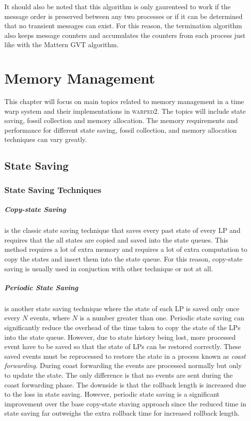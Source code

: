 \documentclass[11pt]{book}
\begin{document}
It should also be noted that this algorithm is only gaurenteed to work if the message order
is preserved between any two processes or if it can be determined that no transient messages
can exist. For this reason, the termination algorithm also keeps message counters and accumulates
the counters from each process just like with the Mattern GVT algorithm.



\chapter{Memory Management}\label{memory_management}

This chapter will focus on main topics related to memory management in a time warp system
and their implementations in \textsc{warped2}. The topics will include state saving, fossil
collection and memory allocation. The memory requirements and performance for different state
saving, fossil collection, and memory allocation techniques can vary greatly.

\section{State Saving}

\subsection{State Saving Techniques}

\paragraph{Copy-state Saving} is the classic state saving technique that saves every past
state of every LP and requires that the all states are copied and saved into the state queues.
This method requires a lot of extra memory and requires a lot of extra computation to copy
the states and insert them into the state queue. For this reason, copy-state saving is
usually used in conjuction with other technique or not at all.

\paragraph{Periodic State Saving} is another state saving technique where the state of each LP
is saved only once every $N$ events, where $N$ is a number greater than one. Periodic state
saving can significantly reduce the overhead of the time taken to copy the state of the
LPs into the state queue. However, due to state history being lost, more processed event
have to be saved so that the state of LPs can be restored correctly. These saved events
must be reprocessed to restore the state in a process known as \emph{coast forwarding}.
During coast forwarding the events are processed normally but only to update the state.
The only difference is that no events are sent during the coast forwarding phase. The
downside is that the rollback length is increased due to the loss in state saving. However,
periodic state saving is a significant improvement over the base copy-state staving approach
since the reduced time in state saving far outweighs the extra rollback time for increased
rollback length.
\end{document}
